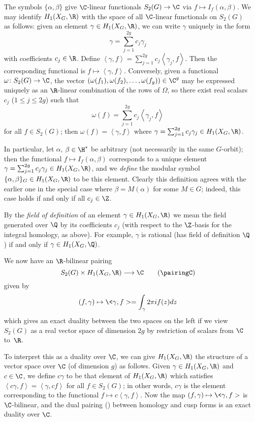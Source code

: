 The symbols $\{\alpha,\beta\}$ give $\C$-linear functionals $S_2(G)
\to\C$ via $f\mapsto I_f(\alpha,\beta)$.  We may identify
$H_1(X_G,\R)$ with the space of all $\C$-linear functionals on
$S_2(G)$ as follows: given an element $\gamma\in H_1(X_G,\R)$, we can
write $\gamma$ uniquely in the form
$$
  \gamma = \sum_{j=1}^{2g}c_j\gamma_j
$$
with coefficients $c_j\in\R$.  Define $\left<\gamma,f\right> =
\sum_{j=1}^{2g}c_j\left<\gamma_j,f\right>$.  Then the corresponding
functional is $f \mapsto \left<\gamma,f\right>$.  Conversely, given a
functional $\omega\colon S_2(G)\to\C$, the vector
$(\omega(f_1),\omega(f_2),\ldots,\omega(f_g))\in\C^g$ may be expressed
uniquely as an $\R$-linear combination of the rows of $\Omega$, so
there exist real scalars $c_j$ ($1\le j\le 2g$) such that $$ \omega(f)
= \sum_{j=1}^{2g}c_j\left<\gamma_j,f\right> $$ for all $f\in S_2(G)$;
then $\omega(f)=\left<\gamma,f\right>$ where
$\gamma=\sum_{j=1}^{2g}c_j\gamma_j \in H_1(X_G,\R)$.

In particular, let $\alpha$, $\beta\in\H^*$ be arbitrary (not
necessarily in the same $G$-orbit); then the functional $f\mapsto
I_f(\alpha,\beta)$ corresponds to a unique element
$\gamma=\sum_{j=1}^{2g}c_j\gamma_j\in H_1(X_G,\R)$, and we {\it
define\/} the modular symbol $\{\alpha,\beta\}_G\in H_1(X_G,\R)$ to be
this element.  Clearly this definition agrees with the earlier one in
the special case where $\beta=M(\alpha)$ for some $M\in G$; indeed,
this case holds if and only if all $c_j\in\Z$.

By the {\it field of definition\/} of an element $\gamma\in
H_1(X_G,\R)$ we mean the field generated over $\Q$ by its coefficients
$c_j$ (with respect to the $\Z$-basis for the integral homology, as
above).  For example, $\gamma$ is rational (has field of definition
$\Q$) if and only if $\gamma\in H_1(X_G,\Q)$.

We now have an $\R$-bilinear pairing
\neweq{\pairingC}
$$
         S_2(G) \times H_1(X_G,\R) \longrightarrow \C \tag{\pairingC}
$$
given by 
$$
    (f,\gamma) \mapsto  \<\gamma,f>=\int_\gamma 2\pi if(z)dz
$$
which gives an exact duality between the two spaces on the left if we
view $S_2(G)$ as a real vector space of dimension $2g$ by restriction
of scalars from $\C$ to~$\R$.  

To interpret this as a duality over $\C$, we can give $H_1(X_G,\R)$
the structure of a vector space over $\C$ (of dimension $g$) as
follows.  Given $\gamma\in H_1(X_G,\R)$ and $c\in\C$, we define
$c\gamma$ to be that element of $H_1(X_G,\R)$ which satisfies
$\left<c\gamma,f\right> = \left<\gamma,cf\right>$ for all $f\in
S_2(G)$; in other words, $c\gamma$ is the element corresponding to the
functional $f\mapsto c\left<\gamma,f\right>$.  Now the map $(f,\gamma)
\mapsto  \<\gamma,f>$ is $\C$-bilinear, and the dual pairing
(\pairingC) between homology and cusp forms is an exact duality over
$\C$.

